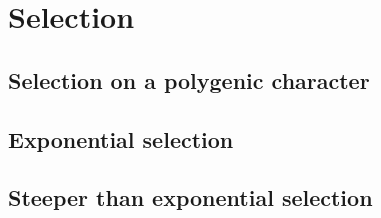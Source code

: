 \documentclass{article}
\begin{document}
\section{Selection}
\subsection{Selection on a polygenic character}

\subsection{Exponential selection}

\subsection{Steeper than exponential selection}


\clearpage


\end{document}
